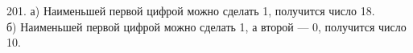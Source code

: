 201. а) Наименьшей первой цифрой можно сделать 1, получится число 18.\\
б) Наименьшей первой цифрой можно сделать 1, а второй --- 0, получится число 10.\\
